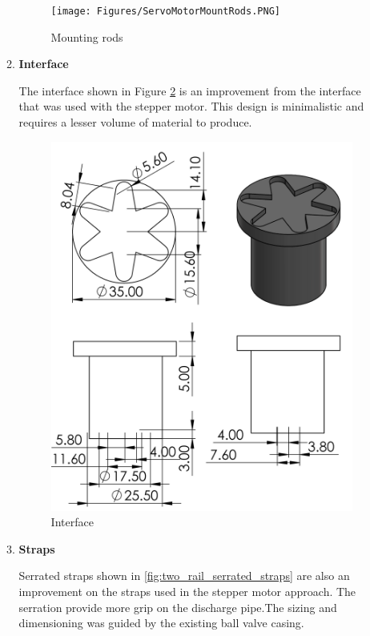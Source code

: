 \begin{enumerate}
\begin{enumerate}
      \begin{figure}[H]
          \centering
          \texttt{[image: Figures/ServoMotorMountRods.PNG]}
          \caption{Mounting rods}
          \label{fig:mounting_rods}
      \end{figure}
      \par
    \item \textbf{Interface}
    \par
    The interface shown in Figure \ref{fig:interface2} is an improvement from the interface that was used with the stepper motor. This design is minimalistic and requires a lesser volume of material to produce. 
    \begin{figure}[H]
        \centering
        \includegraphics[height=.5\textheight]{Figures/Interface.PNG}
        \caption{Interface}
        \label{fig:interface2}
    \end{figure}
    \par
    \item \textbf{Straps}
    \par
    Serrated straps shown in \ref{fig:two_rail_serrated_straps} are also an improvement on the straps used in the stepper motor approach. The serration provide more grip on the discharge pipe.The sizing and dimensioning was guided by the existing ball valve casing.

\end{enumerate}
\end{enumerate}

